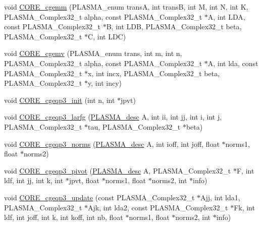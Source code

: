 \begin{DoxyCompactItemize}
\item 
void \hyperlink{group__CORE__PLASMA__Complex32__t_ga10bb88ae2040e01eb7a08a037c2cd51d_ga10bb88ae2040e01eb7a08a037c2cd51d}{C\+O\+R\+E\+\_\+cgemm} (P\+L\+A\+S\+M\+A\+\_\+enum trans\+A, int trans\+B, int M, int N, int K, P\+L\+A\+S\+M\+A\+\_\+\+Complex32\+\_\+t alpha, const P\+L\+A\+S\+M\+A\+\_\+\+Complex32\+\_\+t $\ast$A, int L\+D\+A, const P\+L\+A\+S\+M\+A\+\_\+\+Complex32\+\_\+t $\ast$B, int L\+D\+B, P\+L\+A\+S\+M\+A\+\_\+\+Complex32\+\_\+t beta, P\+L\+A\+S\+M\+A\+\_\+\+Complex32\+\_\+t $\ast$C, int L\+D\+C)
\item 
void \hyperlink{group__CORE__PLASMA__Complex32__t_gaecf8f929b57ddf41ba49204e81db3ea6_gaecf8f929b57ddf41ba49204e81db3ea6}{C\+O\+R\+E\+\_\+cgemv} (P\+L\+A\+S\+M\+A\+\_\+enum trans, int m, int n, P\+L\+A\+S\+M\+A\+\_\+\+Complex32\+\_\+t alpha, const P\+L\+A\+S\+M\+A\+\_\+\+Complex32\+\_\+t $\ast$A, int lda, const P\+L\+A\+S\+M\+A\+\_\+\+Complex32\+\_\+t $\ast$x, int incx, P\+L\+A\+S\+M\+A\+\_\+\+Complex32\+\_\+t beta, P\+L\+A\+S\+M\+A\+\_\+\+Complex32\+\_\+t $\ast$y, int incy)
\item 
void \hyperlink{group__CORE__PLASMA__Complex32__t_ga078a367f5193d1dbb57a56de28c92cf8_ga078a367f5193d1dbb57a56de28c92cf8}{C\+O\+R\+E\+\_\+cgeqp3\+\_\+init} (int n, int $\ast$jpvt)
\item 
void \hyperlink{group__CORE__PLASMA__Complex32__t_gabd3f038fac37e3870e0492050d3d480c_gabd3f038fac37e3870e0492050d3d480c}{C\+O\+R\+E\+\_\+cgeqp3\+\_\+larfg} (\hyperlink{structplasma__desc__t}{P\+L\+A\+S\+M\+A\+\_\+desc} A, int ii, int jj, int i, int j, P\+L\+A\+S\+M\+A\+\_\+\+Complex32\+\_\+t $\ast$tau, P\+L\+A\+S\+M\+A\+\_\+\+Complex32\+\_\+t $\ast$beta)
\item 
void \hyperlink{group__CORE__PLASMA__Complex32__t_ga2cce56de512a1ccc0ff1910b51ac0f4a_ga2cce56de512a1ccc0ff1910b51ac0f4a}{C\+O\+R\+E\+\_\+cgeqp3\+\_\+norms} (\hyperlink{structplasma__desc__t}{P\+L\+A\+S\+M\+A\+\_\+desc} A, int ioff, int joff, float $\ast$norms1, float $\ast$norms2)
\item 
void \hyperlink{group__CORE__PLASMA__Complex32__t_ga83a00af6767c0c8a18023c49a43bcf2e_ga83a00af6767c0c8a18023c49a43bcf2e}{C\+O\+R\+E\+\_\+cgeqp3\+\_\+pivot} (\hyperlink{structplasma__desc__t}{P\+L\+A\+S\+M\+A\+\_\+desc} A, P\+L\+A\+S\+M\+A\+\_\+\+Complex32\+\_\+t $\ast$F, int ldf, int jj, int k, int $\ast$jpvt, float $\ast$norms1, float $\ast$norms2, int $\ast$info)
\item 
void \hyperlink{group__CORE__PLASMA__Complex32__t_gaa07b6c2a4351ee3bd306eef649b941ec_gaa07b6c2a4351ee3bd306eef649b941ec}{C\+O\+R\+E\+\_\+cgeqp3\+\_\+update} (const P\+L\+A\+S\+M\+A\+\_\+\+Complex32\+\_\+t $\ast$Ajj, int lda1, P\+L\+A\+S\+M\+A\+\_\+\+Complex32\+\_\+t $\ast$Ajk, int lda2, const P\+L\+A\+S\+M\+A\+\_\+\+Complex32\+\_\+t $\ast$Fk, int ldf, int joff, int k, int koff, int nb, float $\ast$norms1, float $\ast$norms2, int $\ast$info)

\end{DoxyCompactItemize}

